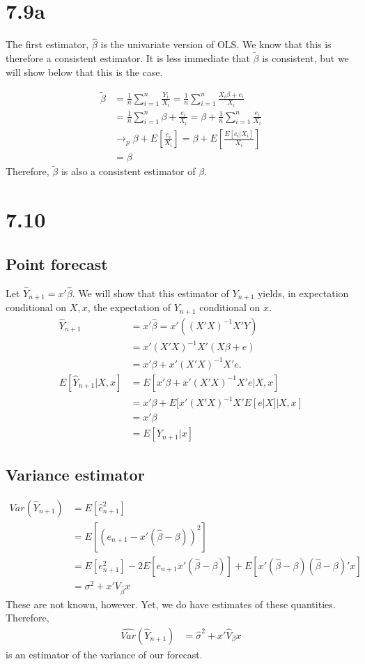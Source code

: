 \documentclass[11pt]{article} %
\begin{document}
\section{7.9a}
The first estimator, $\hat{\beta}$ is the univariate version of OLS. We know that this is therefore a consistent estimator. It is less immediate that $\tilde{\beta}$ is consistent, but we will show below that this is the case.

\begin{align*}
\tilde{\beta} &= \frac{1}{n}\sum_{i=1}^n \frac{Y_i}{X_i} = \frac{1}{n}\sum_{i=1}^n \frac{X_i\beta + e_i}{X_i}\\
&= \frac{1}{n}\sum_{i=1}^n \beta + \frac{e_i}{X_i} =\beta + \frac{1}{n}\sum_{i=1}^n \frac{e_i}{X_i}\\
&\rightarrow_p \beta + E\left[ \frac{e_i}{X_i}\right] =  \beta + E\left[ \frac{E[e_i|X_i]}{X_i}\right]\\
&= \beta
\end{align*}
Therefore, $\tilde{\beta}$ is also a consistent estimator of $\beta$.
\section{7.10}
\subsection{Point forecast}
Let $\hat{Y}_{n+1} = x'\hat{\beta}$. We will show that this estimator of $Y_{n+1}$ yields, in expectation conditional on $X,x$, the expectation of $Y_{n+1}$ conditional on $x$.
\begin{align*}
\hat{Y}_{n+1} &= x'\hat{\beta} = x'((X'X)^{-1}X'Y)\\
&=  x'(X'X)^{-1}X'(X\beta + e)\\
&= x'\beta + x'(X'X)^{-1}X'e.\\
E[\hat{Y}_{n+1}|X,x] &= E[x'\beta + x'(X'X)^{-1}X'e|X,x]\\
&= x'\beta + E[ x'(X'X)^{-1}X'E[e|X]|X,x]\\
&= x'\beta\\
&= E[Y_{n+1}|x]
\end{align*}
\subsection{Variance estimator}
\begin{align*}
Var(\hat{Y}_{n+1}) &= E[\hat{e}_{n+1}^2] \\
&= E[(e_{n+1} - x'(\hat{\beta} - \beta))^2]\\
&= E[e_{n+1}^2] - 2E[e_{n+1}x'(\hat{\beta} - \beta)] + E[x'(\hat{\beta} - \beta)(\hat{\beta} - \beta)'x]\\
&= \sigma^2 + x'V_{\hat{\beta}}x
\end{align*}
These are not known, however. Yet, we do have estimates of these quantities. Therefore,
\begin{align*}
\hat{Var}(\hat{Y}_{n+1})  &= \hat{\sigma}^2 + x'\hat{V}_{\beta} x
\end{align*}
is an estimator of the variance of our forecast.
\end{document}
